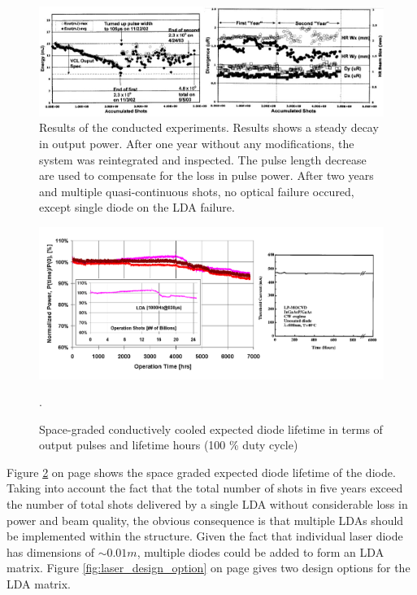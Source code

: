 \begin{figure}[ht!]
\centering
\includegraphics[width = \textwidth]{chapters/img/Nd-YAG_reliability.jpg} 
\caption[Results of the conducted experiments]{Results of the conducted experiments. Results shows a steady decay in output power. After one year without any modifications, the system was reintegrated and inspected. The pulse length decrease are used to compensate for the loss in pulse power. After two years and multiple quasi-continuous shots, no optical failure occured, except single diode on the \acs{LDA} failure.}
\label{fig:ndyag_reliability}
\end{figure}

\begin{figure}[ht!]
\centering
\includegraphics[scale=0.4]{chapters/img/diode_lifetime.png} 
\caption{Space-graded conductively cooled expected diode lifetime in terms of output pulses and lifetime hours (100 \% duty cycle)}.
\label{fig:diode_life_time}
\end{figure}

Figure \ref{fig:diode_life_time} on page \pageref{fig:diode_life_time} shows the space graded expected diode lifetime of the diode. Taking into account the fact that the total number of shots in five years exceed the number of total shots delivered by a single \acs{LDA} without considerable loss in power and beam quality, the obvious consequence is that multiple \acp{LDA} should be implemented within the structure. Given the fact that individual \acs{laser} diode has dimensions of $\sim0.01 m$, multiple diodes could be added to form an \acs{LDA} matrix. Figure \ref{fig:laser_design_option} on page \pageref{fig:laser_design_option} gives two design options for the \acs{LDA} matrix. 

